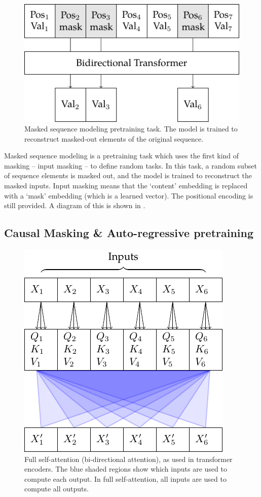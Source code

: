 \begin{figure}
    \centering
    \includegraphics{figures/pretraining-msm.pdf}
    \caption[Masked Sequence Modeling Pretraining]{Masked sequence modeling pretraining task. The model is trained to reconstruct masked-out elements of the original sequence.}
    \hrulefill
    \label{fig:pretraining-msm}
\end{figure}

Masked sequence modeling is a pretraining task which uses the first kind of masking -- input masking -- to define random tasks. In this task, a random subset of sequence elements is masked out, and the model is trained to reconstruct the masked inputs. Input masking means that the `content' embedding is replaced with a `mask' embedding (which is a learned vector). The positional encoding is still provided. A diagram of this is shown in .

\subsection{Causal Masking \& Auto-regressive pretraining}
\label{ss:autoreg-pretraining}

\begin{figure}
    \centering
    \includegraphics[]{figures/attn-1-self.pdf}
    \caption[Self-attention]{Full self-attention (bi-directional attention), as used in transformer encoders. The blue shaded regions show which inputs are used to compute each output. In full self-attention, all inputs are used to compute all outputs.}
    \hrulefill
    \label{fig:self-attn}
\end{figure}

